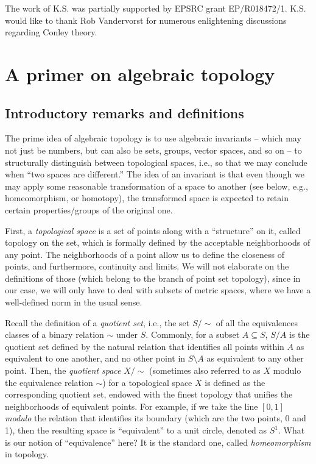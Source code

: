 \documentclass[11pt]{article}
\begin{document}
The work of K.S. was partially supported by EPSRC grant EP/R018472/1. K.S. would like to thank Rob Vandervorst for numerous enlightening discussions regarding Conley theory.





\appendix



\section{A primer on algebraic topology}

\subsection{Introductory remarks and definitions}

The prime idea of algebraic topology is to use algebraic invariants -- which may not just be numbers, but can also be sets, groups, vector spaces, and so on -- to structurally distinguish between topological spaces, i.e., so that we may conclude when ``two spaces are different.'' The idea of an invariant is that even though we may apply some reasonable transformation of a space to another (see below, e.g., homeomorphism, or homotopy), the transformed space is expected to retain certain properties/groups of the original one. 

First, a {\em topological space} is a set of points along with a ``structure'' on it, called topology on the set, which is formally defined by the acceptable neighborhoods of any point. The neighborhoods of a point allow us to define the closeness of points, and furthermore, continuity and limits. We will not elaborate on the definitions of those (which belong to the branch of point set topology), since in our case, we will only have to deal with subsets of metric spaces, where we have a well-defined norm in the usual sense.

Recall the definition of a {\em quotient set}, i.e., the set $S/\sim$ of all the equivalences classes of a binary relation $\sim$ under $S$. Commonly, for a subset $A\subseteq S$, $S/A$ is the quotient set defined by the natural relation that identifies all points within $A$ as equivalent to one another, and no other point in $S\setminus A$ as equivalent to any other point. Then, the {\em quotient space} $X/\sim$ (sometimes also referred to as $X$ modulo the equivalence relation $\sim$) for a topological space $X$ is defined as the corresponding quotient set, endowed with the finest topology that unifies the neighborhoods of equivalent points. For example, if we take the line $[0,1]$ {\em modulo} the relation that identifies its boundary (which are the two points, 0 and 1), then the resulting space is ``equivalent'' to a unit circle, denoted as $S^1$. What is our notion of ``equivalence'' here? It is the standard one, called {\em homeomorphism} in topology.
\end{document}
